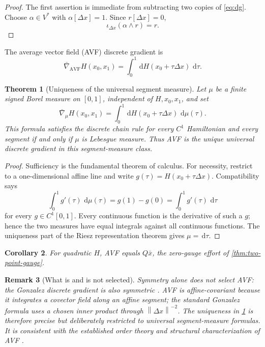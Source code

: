 \documentclass[11pt,a4paper]{article}
\newtheorem{theorem}{Theorem}[section]
\newtheorem{corollary}[theorem]{Corollary}
\newtheorem{remark}[theorem]{Remark}
\newcommand{\dd}{\,\mathrm d}
\newcommand{\norm}[1]{\left\lVert #1\right\rVert}
\newcommand{\AVF}{\operatorname{AVF}}
\begin{document}
\begin{proof}
The first assertion is immediate from subtracting two copies of
\cref{eq:dg}. Choose \(\alpha\in V^*\) with
\(\alpha[\Delta x]=1\). Since \(r[\Delta x]=0\),
\[
 \iota_{\Delta x}(\alpha\wedge r)=r.
\]
\end{proof}

The average vector field (AVF) discrete gradient is
\begin{equation}\label{eq:avf}
 \bar\nabla_{\AVF}H(x_0,x_1)
 =\int_0^1\dd H(x_0+\tau\Delta x)\,\dd\tau.
\end{equation}

\begin{theorem}[Uniqueness of the universal segment measure]
\label{thm:avf-unique}
Let \(\mu\) be a finite signed Borel measure on \([0,1]\), independent of
\(H,x_0,x_1\), and set
\[
 \bar\nabla_\mu H(x_0,x_1)
 =\int_0^1\dd H(x_0+\tau\Delta x)\,\dd\mu(\tau).
\]
This formula satisfies the discrete chain rule for every \(C^1\)
Hamiltonian and every segment if and only if \(\mu\) is Lebesgue measure.
Thus AVF is the unique universal discrete gradient in this
segment-measure class.
\end{theorem}

\begin{proof}
Sufficiency is the fundamental theorem of calculus. For necessity,
restrict to a one-dimensional affine line and write
\(g(\tau)=H(x_0+\tau\Delta x)\). Compatibility says
\[
 \int_0^1 g'(\tau)\,\dd\mu(\tau)=g(1)-g(0)
 =\int_0^1g'(\tau)\,\dd\tau
\]
for every \(g\in C^1[0,1]\). Every continuous function is the derivative
of such a \(g\); hence the two measures have equal integrals against all
continuous functions. The uniqueness part of the Riesz representation
theorem gives \(\mu=\dd\tau\).
\end{proof}

\begin{corollary}
For quadratic \(H\), AVF equals \(Q\bar x\), the zero-gauge effort of
\cref{thm:two-point-gauge}.
\end{corollary}

\begin{remark}[What is and is not selected]
Symmetry alone does not select AVF: the Gonzalez discrete gradient is also
symmetric \cite{gonzalez1996}. AVF is affine-covariant because it
integrates a covector field along an affine segment; the standard Gonzalez
formula uses a chosen inner product through
\(\norm{\Delta x}^{-2}\). The uniqueness in
\cref{thm:avf-unique} is therefore precise but deliberately restricted to
universal segment-measure formulas. It is consistent with the established
order theory and structural characterization of AVF
\cite{quispel2008,eidnes2022}.
\end{remark}
\end{document}
